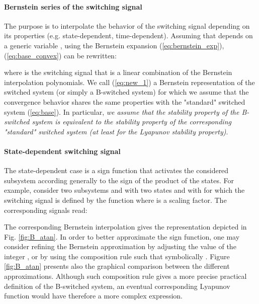 \documentclass[12pt]{article}
\begin{document}
\paragraph{Bernstein series of the switching signal}

The purpose is to interpolate the behavior of the switching signal depending on its properties (e.g. state-dependent, time-dependent). 
Assuming that  depends on a generic variable , using the Bernstein expansion (\ref{eq:bernstein_exp}), (\ref{eq:base_convex}) can be rewritten:



\noindent
where  is the switching signal that is a linear combination of the Bernstein interpolation polynomials.
\noindent
We call (\ref{eq:new_1}) a Bernstein representation of the switched system (or simply a B-switched system) for which we assume that the convergence behavior shares the same 
properties with the "standard" switched system (\ref{eq:base}). In particular, {\it we assume that the stability property of the B-switched system is equivalent to the stability property 
of the corresponding "standard" switched system (at least for the Lyapunov stability property)}.

\paragraph{State-dependent switching signal} The state-dependent case is a sign function that activates the considered subsystem according generally to the sign of the product of the states. 
 For example, consider two subsystems  and  with two states  and  with  for which the switching signal 
 is defined by the function  where  is a scaling factor. The corresponding  signals read:
 
 
 
 The corresponding Bernstein interpolation gives the representation depicted in Fig. \ref{fig:B_atan}. 
 In order to better approximate the sign function, one may consider refining the Bernstein approximation by adjusting the value of the integer , or by using the composition 
 rule such that symbolically . Figure \ref{fig:B_atan} presents also the graphical comparison between the different approximations.
 Although such composition rule gives a more precise practical definition of the B-switched system, an eventual corresponding Lyapunov function would have therefore a more complex 
 expression.
 
\end{document}
